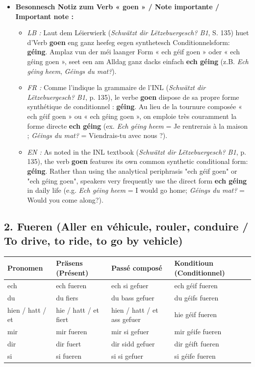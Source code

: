 \begin{itemize}
    \item \textbf{Besonnesch Notiz zum Verb « goen » / Note importante / Important note :}
    \begin{itemize}
        \item \textit{LB :} Laut dem Léierwierk (\textit{Schwätzt dir Lëtzebuergesch? B1}, S. 135) huet d'Verb \textbf{goen} eng ganz heefeg eegen synthetesch Conditionnelsform: \textbf{géing}. Amplaz vun der méi laanger Form « ech géif goen » oder « ech géing goen », seet een am Alldag ganz dacks einfach \textbf{ech géing} (z.B. \textit{Ech géing heem}, \textit{Géings du mat?}).
        \item \textit{FR :} Comme l'indique la grammaire de l'INL (\textit{Schwätzt dir Lëtzebuergesch? B1}, p. 135), le verbe \textbf{goen} dispose de sa propre forme synthétique de conditionnel : \textbf{géing}. Au lieu de la tournure composée « ech géif goen » ou « ech géing goen », on emploie très couramment la forme directe \textbf{ech géing} (ex. \textit{Ech géing heem} = Je rentrerais à la maison ; \textit{Géings du mat?} = Viendrais-tu avec nous ?).
        \item \textit{EN :} As noted in the INL textbook (\textit{Schwätzt dir Lëtzebuergesch? B1}, p. 135), the verb \textbf{goen} features its own common synthetic conditional form: \textbf{géing}. Rather than using the analytical periphrasis "ech géif goen" or "ech géing goen", speakers very frequently use the direct form \textbf{ech géing} in daily life (e.g. \textit{Ech géing heem} = I would go home; \textit{Géings du mat?} = Would you come along?).
    \end{itemize}
\end{itemize}

\vspace{1em}

\subsection*{2. Fueren (Aller en véhicule, rouler, conduire / To drive, to ride, to go by vehicle)}
\begin{center}
\small
\begin{tabular}{llll}
\toprule
\textbf{Pronomen} & \textbf{Präsens (Présent)} & \textbf{Passé composé} & \textbf{Konditioun (Conditionnel)} \\
\midrule
ech & ech fueren & ech si gefuer & ech géif fueren \\
du & du fiers & du bass gefuer & du géifs fueren \\
hien / hatt / et & hie / hatt / et fiert & hien / hatt / et ass gefuer & hie géif fueren \\
mir & mir fueren & mir si gefuer & mir géife fueren \\
dir & dir fuert & dir sidd gefuer & dir géift fueren \\
si & si fueren & si si gefuer & si géife fueren \\
\bottomrule
\end{tabular}
\end{center}

